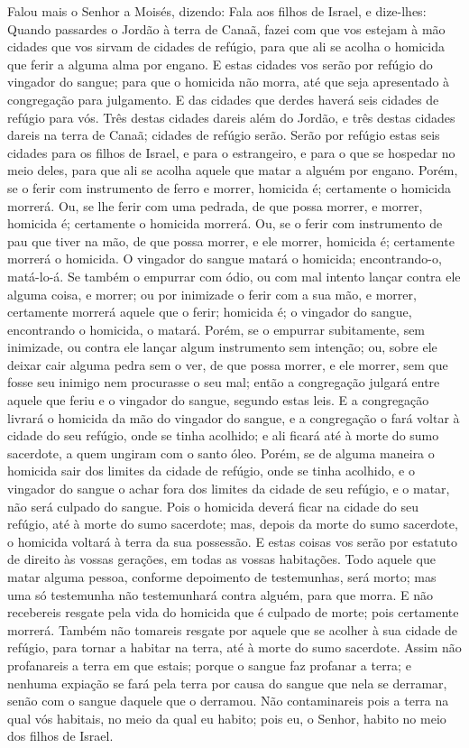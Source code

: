 Falou mais o Senhor a Moisés, dizendo: Fala aos filhos de
Israel, e dize-lhes: Quando passardes o Jordão à terra de Canaã,
fazei com que vos estejam à mão cidades que vos sirvam de
cidades de refúgio, para que ali se acolha o homicida que ferir a
alguma alma por engano. E estas cidades vos serão por refúgio
do vingador do sangue; para que o homicida não morra, até que seja
apresentado à congregação para julgamento. E das cidades que
derdes haverá seis cidades de refúgio para vós. Três destas
cidades dareis além do Jordão, e três destas cidades dareis na terra
de Canaã; cidades de refúgio serão. Serão por refúgio estas
seis cidades para os filhos de Israel, e para o estrangeiro, e para
o que se hospedar no meio deles, para que ali se acolha aquele que
matar a alguém por engano. Porém, se o ferir com instrumento
de ferro e morrer, homicida é; certamente o homicida morrerá.
Ou, se lhe ferir com uma pedrada, de que possa morrer, e
morrer, homicida é; certamente o homicida morrerá. Ou, se o
ferir com instrumento de pau que tiver na mão, de que possa morrer,
e ele morrer, homicida é; certamente morrerá o homicida. O
vingador do sangue matará o homicida; encontrando-o, matá-lo-á.
Se também o empurrar com ódio, ou com mal intento lançar
contra ele alguma coisa, e morrer; ou por inimizade o ferir
com a sua mão, e morrer, certamente morrerá aquele que o ferir;
homicida é; o vingador do sangue, encontrando o homicida, o matará.
Porém, se o empurrar subitamente, sem inimizade, ou contra
ele lançar algum instrumento sem intenção; ou, sobre ele
deixar cair alguma pedra sem o ver, de que possa morrer, e ele
morrer, sem que fosse seu inimigo nem procurasse o seu mal;
então a congregação julgará entre aquele que feriu e o
vingador do sangue, segundo estas leis. E a congregação
livrará o homicida da mão do vingador do sangue, e a congregação o
fará voltar à cidade do seu refúgio, onde se tinha acolhido; e ali
ficará até à morte do sumo sacerdote, a quem ungiram com o santo
óleo. Porém, se de alguma maneira o homicida sair dos limites
da cidade de refúgio, onde se tinha acolhido, e o vingador do
sangue o achar fora dos limites da cidade de seu refúgio, e o matar,
não será culpado do sangue. Pois o homicida deverá ficar na
cidade do seu refúgio, até à morte do sumo sacerdote; mas, depois da
morte do sumo sacerdote, o homicida voltará à terra da sua
possessão. E estas coisas vos serão por estatuto de direito
às vossas gerações, em todas as vossas habitações. Todo
aquele que matar alguma pessoa, conforme depoimento de testemunhas,
será morto; mas uma só testemunha não testemunhará contra alguém,
para que morra. E não recebereis resgate pela vida do
homicida que é culpado de morte; pois certamente morrerá.
Também não tomareis resgate por aquele que se acolher à sua
cidade de refúgio, para tornar a habitar na terra, até à morte do
sumo sacerdote. Assim não profanareis a terra em que estais;
porque o sangue faz profanar a terra; e nenhuma expiação se fará
pela terra por causa do sangue que nela se derramar, senão com o
sangue daquele que o derramou. Não contaminareis pois a terra
na qual vós habitais, no meio da qual eu habito; pois eu, o Senhor,
habito no meio dos filhos de Israel.

